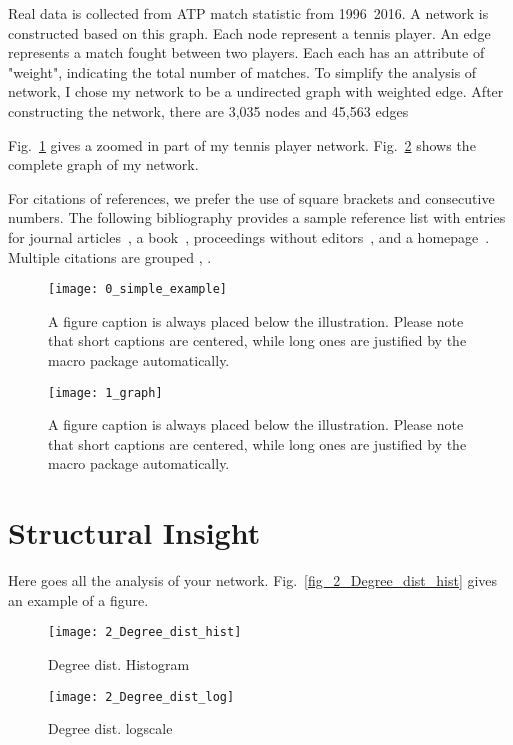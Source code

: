 \documentclass[runningheads]{llncs}
\begin{document}
Real data is collected from ATP match statistic from 1996~2016. A network is constructed based on this graph. 
Each node represent a tennis player. An edge represents a match fought between two players. Each each has an attribute of "weight", indicating the total number of matches.
To simplify the analysis of network, I chose my network to be a undirected graph with weighted edge.
After constructing the network, there are 3,035 nodes and 45,563 edges

Fig.~\ref{fig_0_simple_example} gives a zoomed in part of my tennis player network.
Fig.~\ref{fig_mynk} shows the complete graph of my network.


For citations of references, we prefer the use of square brackets
and consecutive numbers. The following bibliography provides
a sample reference list with entries for journal
articles~\cite{ref_article1}, a book~\cite{ref_book1}, proceedings without editors~\cite{ref_proc1},
and a homepage~\cite{ref_url1}. Multiple citations are grouped
\cite{ref_article1,ref_book1},
\cite{ref_article1,ref_book1,ref_proc1,ref_url1}.


\begin{figure}
\texttt{[image: 0\_simple\_example]}
\caption{A figure caption is always placed below the illustration.
Please note that short captions are centered, while long ones are
justified by the macro package automatically.} \label{fig_0_simple_example}
\end{figure}

\begin{figure}
\texttt{[image: 1\_graph]}
\caption{A figure caption is always placed below the illustration.
Please note that short captions are centered, while long ones are
justified by the macro package automatically.} \label{fig_mynk}
\end{figure}


\section{Structural Insight}
Here goes all the analysis of your network. Fig.~\ref{fig_2_Degree_dist_hist} gives an example of a figure.



\begin{figure}
    \centering
    \begin{minipage}{0.5\textwidth}
        \centering
        \texttt{[image: 2\_Degree\_dist\_hist]} %
        \caption{Degree dist. Histogram}
        \label{fig_2_Degree_dist_hist}
    \end{minipage}\hfill
    \begin{minipage}{0.5\textwidth}
        \centering
        \texttt{[image: 2\_Degree\_dist\_log]} %
        \caption{Degree dist. logscale}
        \label{fig_2_Degree_dist_log}
    \end{minipage}
\end{figure}
\end{document}
